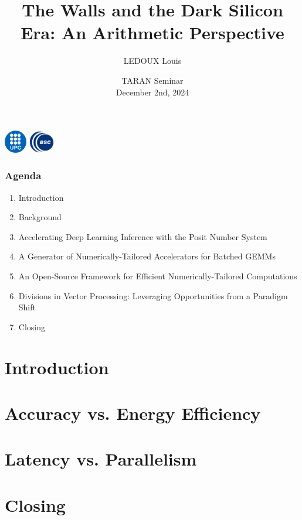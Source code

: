 \documentclass[]{beamer}
\author[TARAN Seminar]{LEDOUX Louis}
\institute[]{Universitat Politècnica de Catalunya (UPC)\\ Barcelona Supercomputing Center (BSC)
\vspace{2mm} \\
}
\title[]{The Walls and the Dark Silicon Era: An Arithmetic Perspective}
\date[December 2nd, 2024]{\small{TARAN Seminar} \\ \small{December 2nd, 2024}}
\begin{document}
\begin{frame}[plain]
	\titlepage
	\begin{center}%
		\vspace{-0.2cm}
		\includegraphics[height=1cm]{./figs/darkblue-logo.pdf}
		\hspace{2mm}
		\includegraphics[height=1cm]{./figs/bsc_logo_2.jpg}
	\end{center}
\end{frame}

\begin{frame}
\frametitle{Agenda}
	\begin{enumerate}
		\item Introduction
		\item Background
		\item Accelerating Deep Learning Inference with the Posit Number System
		\item A Generator of Numerically-Tailored Accelerators for Batched GEMMs
		\item An Open-Source Framework for Efficient Numerically-Tailored Computations
		\item Divisions in Vector Processing: Leveraging Opportunities from a Paradigm Shift
		\item Closing
	\end{enumerate}
\end{frame}

\section{Introduction}


\section{Accuracy vs. Energy Efficiency}


\section{Latency vs. Parallelism}

\section{Closing}

\appendix


 
\end{document}

